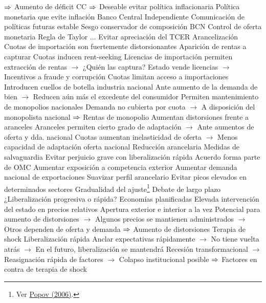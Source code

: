 \documentclass{nuevotema}
\begin{document}
\begin{esquemal}
				\4[] $\then$ Aumento de déficit CC
				\4[] $\then$ Deseable evitar política inflacionaria
				\4 Política monetaria que evite inflación
				\4[] Banco Central Independiente
				\4[] Comunicación de políticas futuras estable
				\4[] Sesgo conservador de composición BCN
				\4[] Control de oferta monetaria
				\4[] Regla de Taylor
				\4[] ...
				\4[$\then$] Evitar apreciación del TCER
			\3 Arancelización
				\4 Cuotas de importación son fuertemente distorsionantes
				\4[] Aparición de rentas a capturar
				\4 Cuotas inducen rent-seeking
				\4[] Licencias de importación permiten extracción de rentas
				\4[] $\to$ ¿Quién las captura?
				\4[] Estado vende licencias
				\4[] $\to$ Incentivos a fraude y corrupción
				\4 Cuotas limitan acceso a importaciones
				\4[] Introducen cuellos de botella industria nacional
				\4[] Ante aumento de la demanda de bien
				\4[] $\to$ Reducen aún más el excedente del consumidor
				\4 Permiten mantenimiento de monopolios nacionales
				\4[] Demanda no cubierta por cuota
				\4[] $\to$ A disposición del monopolista nacional
				\4[] $\then$ Rentas de monopolio
				\4 Aumentan distorsiones frente a aranceles
				\4[] Aranceles permiten cierto grado de adaptación
				\4[] $\to$ Ante aumentos de oferta y dda. nacional
				\4[] Cuotas aumentan inelasticidad de oferta
				\4[] $\to$ Menos capacidad de adaptación oferta nacional
			\3 Reducción arancelaria
				\4 Medidas de salvaguardia
				\4[] Evitar perjuicio grave con liberalización rápida
				\4[] Acuerdo forma parte de OMC
				\4 Aumentar exposición a competencia exterior
				\4 Aumentar demanda nacional de exportaciones
				\4 Suavizar perfil arancelario
				\4[] Evitar picos elevados en determinados sectores
			\3 Gradualidad del ajuste\footnote{Ver \href{https://www.econstor.eu/bitstream/10419/140734/1/505623722.pdf}{Popov (2006)}.}
				\4 Debate de largo plazo
				\4[] ¿Liberalización progresiva o rápida?
				\4 Economías planificadas
				\4[] Elevada intervención del estado en precios relativos
				\4[] Apertura exterior e interior a la vez
				\4[] Potencial para aumento de distorsiones
				\4[] $\to$ Algunos precios se mantienen administrados
				\4[] $\to$ Otros dependen de oferta y demanda
				\4[] $\then$  Aumento de distorsiones
				\4 Terapia de shock
				\4[] Liberalización rápida
				\4[] Anclar expectativas rápidamente
				\4[] $\to$ No tiene vuelta atrás
				\4[] $\to$ En el futuro, liberalización se mantendrá
				\4[] Recesión transformacional
				\4[] $\to$ Reasignación rápida de factores
				\4[] $\to$ Colapso institucional posible
				\4[] $\then$ Factores en contra de terapia de shock

\end{esquemal}
\end{document}
